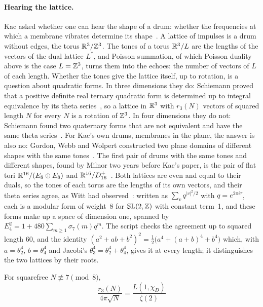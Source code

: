 \documentclass[11pt]{article}
\begin{document}
\paragraph{Hearing the lattice.}
Kac asked whether one can hear the shape of a drum: whether the frequencies at which a membrane vibrates determine its shape~\cite{Kac}.
A lattice of impulses is a drum without edges, the torus $\mathbb{R}^3/\mathbb{Z}^3$.
The tones of a torus $\mathbb{R}^3/L$ are the lengths of the vectors of the dual lattice $L^*$, and Poisson summation, of which Poisson duality above is the case $L=\mathbb{Z}^3$, turns them into the echoes: the number of vectors of $L$ of each length.
Whether the tones give the lattice itself, up to rotation, is a question about quadratic forms.
In three dimensions they do: Schiemann proved that a positive definite real ternary quadratic form is determined up to integral equivalence by its theta series~\cite{Schiemann97}, so a lattice in $\mathbb{R}^3$ with $r_3(N)$ vectors of squared length $N$ for every $N$ is a rotation of $\mathbb{Z}^3$.
In four dimensions they do not: Schiemann found two quaternary forms that are not equivalent and have the same theta series~\cite{Schiemann90}.
For Kac's own drums, membranes in the plane, the answer is also no: Gordon, Webb and Wolpert constructed two plane domains of different shapes with the same tones~\cite{GordonWebbWolpert}.
The first pair of drums with the same tones and different shapes, found by Milnor two years before Kac's paper, is the pair of flat tori $\mathbb{R}^{16}/(E_8\oplus E_8)$ and $\mathbb{R}^{16}/D_{16}^+$~\cite{Milnor}.
Both lattices are even and equal to their duals, so the tones of each torus are the lengths of its own vectors, and their theta series agree, as Witt had observed~\cite{Witt}: written as $\sum_v q^{|v|^2/2}$ with $q=e^{2\pi i\tau}$, each is a modular form of weight~8 for $\mathrm{SL}(2,\mathbb{Z})$ with constant term~1, and these forms make up a space of dimension one, spanned by $E_4^2 = 1+480\sum_{m\ge1}\sigma_7(m)q^m$.
The script  checks the agreement up to squared length 60, and the identity $(a^2+ab+b^2)^2=\tfrac12\bigl(a^4+(a+b)^4+b^4\bigr)$ which, with $a=\theta_2^4$, $b=\theta_4^4$ and Jacobi's $\theta_3^4=\theta_2^4+\theta_4^4$, gives it at every length; it distinguishes the two lattices by their roots.

\begin{derivation}\label{d:size}
For squarefree $N\not\equiv7\pmod8$,
\[
  \boxed{\;\frac{r_3(N)}{4\pi\sqrt N} = \frac{L(1,\chi_D)}{\zeta(2)}\;}
\]
\end{derivation}
\end{document}

